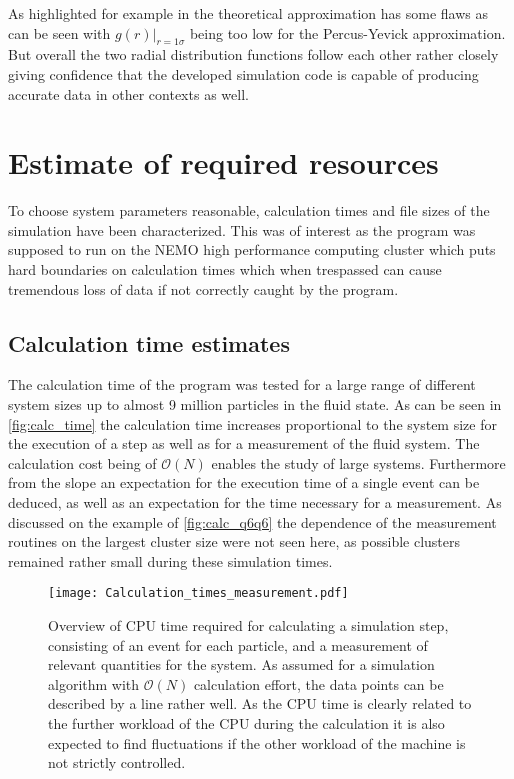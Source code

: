 As highlighted for example in \cite{Hansen2006} the theoretical approximation has some flaws as can be seen with $g(r)|_{r=1\sigma}$ being too low for the Percus-Yevick approximation. But overall the two radial distribution functions follow each other rather closely giving confidence that the developed simulation code is capable of producing accurate data in other contexts as well.\\

\section{Estimate of required resources}
\label{sec:resources}
To choose system parameters reasonable, calculation times and file sizes of the simulation have been characterized. This was of interest as the program was supposed to run on the NEMO high performance computing cluster which puts hard boundaries on calculation times which when trespassed can cause tremendous loss of data if not correctly caught by the program.\\
 
\subsection{Calculation time estimates}
\label{sec:calc_times}
The calculation time of the program was tested for a large range of different system sizes up to almost 9 million particles in the fluid state. As can be seen in \autoref{fig:calc_time} the calculation time increases proportional to the system size for the execution of a step as well as for a measurement of the fluid system. The calculation cost being of $\mathcal{O}(N)$ enables the study of large systems. Furthermore from the slope an expectation for the execution time of a single event can be deduced, as well as an expectation for the time necessary for a measurement. As discussed on the example of \autoref{fig:calc_q6q6} the dependence of the measurement routines on the largest cluster size were not seen here, as possible clusters remained rather small during these simulation times.\\

\begin{figure}[h!]
\centering
\texttt{[image: Calculation\_times\_measurement.pdf]}
\caption[Calculation time estimate]{Overview of CPU time required for calculating a simulation step, consisting of an event for each particle, and a measurement of relevant quantities for the system. As assumed for a simulation algorithm with $\mathcal{O}(N)$ calculation effort, the data points can be described by a line rather well. As the CPU time is clearly related to the further workload of the CPU during the calculation it is also expected to find fluctuations if the other workload of the machine is not strictly controlled.}
\label{fig:calc_time}
\end{figure}


